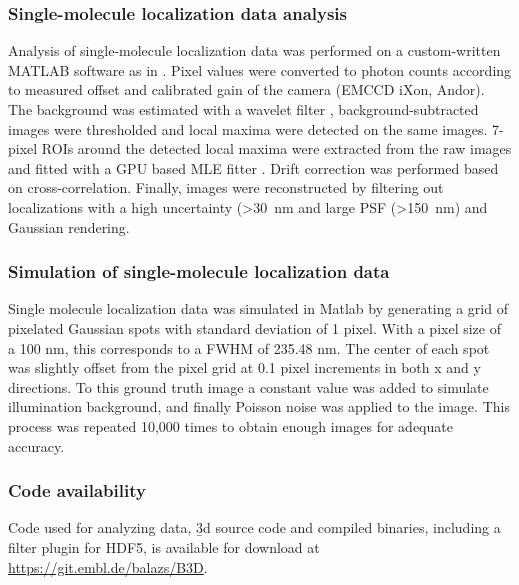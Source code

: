 \subsubsection{Single-molecule localization data analysis}
Analysis of single-molecule localization data was performed on a custom-written MATLAB software as in \cite{deschamps_efficient_2016}. Pixel values were converted to photon counts according to measured offset and calibrated gain of the camera (EMCCD iXon, Andor). The background was estimated with a wavelet filter \cite{izeddin_wavelet_2012}, background-subtracted images were thresholded and local maxima were detected on the same images. 7-pixel ROIs around the detected local maxima were extracted from the raw images and fitted with a GPU based MLE fitter \cite{smith_fast_2010}. Drift correction was performed based on cross-correlation. Finally, images were
reconstructed by filtering out localizations with a high uncertainty (>\SI{30}{nm} and large PSF (>\SI{150}{nm}) and Gaussian rendering.

\subsubsection{Simulation of single-molecule localization data}
Single molecule localization data was simulated in Matlab by generating a grid of pixelated Gaussian spots with standard deviation of 1 pixel. With a pixel size of a 100 nm, this corresponds to a FWHM of 235.48 nm. The center of each spot was slightly offset from the pixel grid at 0.1 pixel increments in both x and y directions. To this ground truth image a constant value was added to simulate illumination background, and finally Poisson noise was applied to the image. This process was repeated 10,000 times to obtain enough images for adequate accuracy.

\subsubsection{Code availability}
Code used for analyzing data, \b3d source code and compiled binaries, including a filter plugin for HDF5, is available for download at \url{https://git.embl.de/balazs/B3D}.






